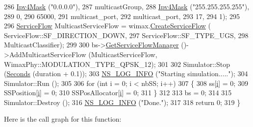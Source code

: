 \begin{DoxyCode}
286                                             \hyperlink{classns3_1_1Ipv4Mask}{Ipv4Mask} (\textcolor{stringliteral}{"0.0.0.0"}),
287                                             multicastGroup,
288                                             \hyperlink{classns3_1_1Ipv4Mask}{Ipv4Mask} (\textcolor{stringliteral}{"255.255.255.255"}),
289                                             0,
290                                             65000,
291                                             multicast\_port,
292                                             multicast\_port,
293                                             17,
294                                             1);
295 
296   \hyperlink{classns3_1_1ServiceFlow}{ServiceFlow} MulticastServiceFlow = wimax.\hyperlink{classns3_1_1WimaxHelper_aed0c1ffdcd62234c14965f899efc88c1}{CreateServiceFlow} (
      ServiceFlow::SF\_DIRECTION\_DOWN,
297                                                               ServiceFlow::SF\_TYPE\_UGS,
298                                                               MulticastClassifier);
299 
300   bs->\hyperlink{classns3_1_1BaseStationNetDevice_a16a12a1027391156e044a28534c0eaf2}{GetServiceFlowManager} ()->AddMulticastServiceFlow (MulticastServiceFlow, 
      WimaxPhy::MODULATION\_TYPE\_QPSK\_12);
301 
302   Simulator::Stop (\hyperlink{group__timecivil_ga33c34b816f8ff6628e33d5c8e9713b9e}{Seconds} (duration + 0.1));
303   \hyperlink{group__logging_gafbd73ee2cf9f26b319f49086d8e860fb}{NS\_LOG\_INFO} (\textcolor{stringliteral}{"Starting simulation....."});
304   Simulator::Run ();
305 
306   \textcolor{keywordflow}{for} (\textcolor{keywordtype}{int} i = 0; i < nbSS; i++)
307     \{
308       ss[\hyperlink{bernuolliDistribution_8m_a6f6ccfcf58b31cb6412107d9d5281426}{i}] = 0;
309       SSPosition[\hyperlink{bernuolliDistribution_8m_a6f6ccfcf58b31cb6412107d9d5281426}{i}] = 0;
310       SSPosAllocator[\hyperlink{bernuolliDistribution_8m_a6f6ccfcf58b31cb6412107d9d5281426}{i}] = 0;
311     \}
312 
313   bs = 0;
314 
315   Simulator::Destroy ();
316   \hyperlink{group__logging_gafbd73ee2cf9f26b319f49086d8e860fb}{NS\_LOG\_INFO} (\textcolor{stringliteral}{"Done."});
317 
318   \textcolor{keywordflow}{return} 0;
319 \}
\end{DoxyCode}


Here is the call graph for this function\+:


